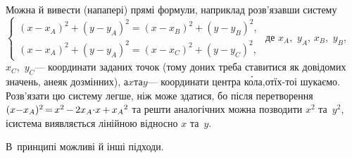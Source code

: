 Можна й вивести (на\nolinebreak[3] папері) прямі формули, наприклад розв'язавши систему
$\left\{
\begin{array}{c}
(x{-}x_A)^2+(y{-}y_A)^2 = (x{-}x_B)^2+(y{-}y_B)^2,\\
(x{-}x_A)^2+(y{-}y_A)^2 = (x{-}x_C)^2+(y{-}y_C)^2,
\end{array}
\right.$
де $x_A$,~$y_A$, $x_B$,~$y_B$, $x_C$,~$y_C$\nolinebreak[3] --- координати заданих точок (тому до\nolinebreak[3] них треба ставитися як до\nolinebreak[3] відомих значень, а\nolinebreak[3] не\nolinebreak[3] як до\nolinebreak[3] змінних), а\nolinebreak[3] $x$\nolinebreak[1] та\nolinebreak[3] $y$\nolinebreak[3] --- координати центра к\'{о}ла,\linebreak[1] от\nolinebreak[1] їх-то\nolinebreak[1] і шукаємо. Розв'язати цю систему легше, ніж може здатися, бо після перетворення ${(x{-}x_A)^2}\dib{{=}}x^2\dib{{-}}2x_A{\cdot}x\dib{{+}}{x_A}^2$ та решти аналогічних можна позводити $x^2$ та~$y^2$, і\nolinebreak[3] система виявляється лінійною відносно $x$ та~$y$.

В~принципі можливі й інші підходи.
